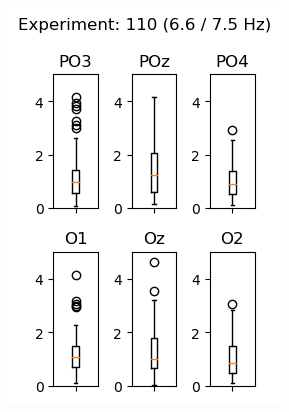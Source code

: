 \begin{figure}[ht]
    \centering
    \begin{subfigure}{0.3\textwidth}
        \includegraphics[width=\linewidth]{images/results/1106675.png}
        \label{fig:1106675}
    \end{subfigure}
    \hfill
    \begin{subfigure}{0.3\textwidth}

\end{subfigure}
\end{figure}
